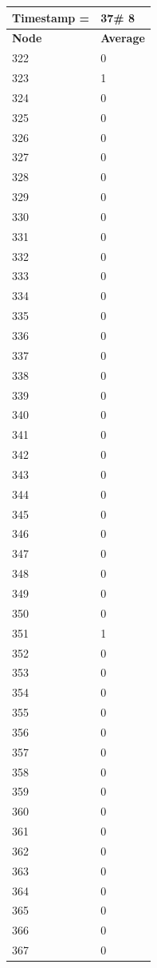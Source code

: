 \begin{tabular}{|l||l|}
\hline
\textbf{Timestamp =} & \textbf{37}\# 8\\\hline
	\textbf{Node} & \textbf{Average} \\ \hline
\hline
	322 & 0 \\ \hline
	323 & 1 \\ \hline
	324 & 0 \\ \hline
	325 & 0 \\ \hline
	326 & 0 \\ \hline
	327 & 0 \\ \hline
	328 & 0 \\ \hline
	329 & 0 \\ \hline
	330 & 0 \\ \hline
	331 & 0 \\ \hline
	332 & 0 \\ \hline
	333 & 0 \\ \hline
	334 & 0 \\ \hline
	335 & 0 \\ \hline
	336 & 0 \\ \hline
	337 & 0 \\ \hline
	338 & 0 \\ \hline
	339 & 0 \\ \hline
	340 & 0 \\ \hline
	341 & 0 \\ \hline
	342 & 0 \\ \hline
	343 & 0 \\ \hline
	344 & 0 \\ \hline
	345 & 0 \\ \hline
	346 & 0 \\ \hline
	347 & 0 \\ \hline
	348 & 0 \\ \hline
	349 & 0 \\ \hline
	350 & 0 \\ \hline
	351 & 1 \\ \hline
	352 & 0 \\ \hline
	353 & 0 \\ \hline
	354 & 0 \\ \hline
	355 & 0 \\ \hline
	356 & 0 \\ \hline
	357 & 0 \\ \hline
	358 & 0 \\ \hline
	359 & 0 \\ \hline
	360 & 0 \\ \hline
	361 & 0 \\ \hline
	362 & 0 \\ \hline
	363 & 0 \\ \hline
	364 & 0 \\ \hline
	365 & 0 \\ \hline
	366 & 0 \\ \hline
	367 & 0 \\ \hline
\end{tabular}
